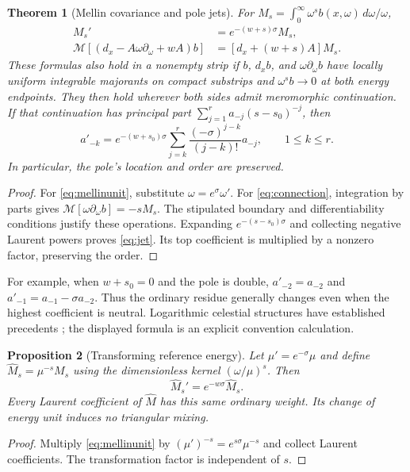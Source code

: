 \documentclass[11pt]{article}
\newtheorem{theorem}{Theorem}
\newtheorem{proposition}[theorem]{Proposition}
\theoremstyle{remark}\newtheorem{remark}[theorem]{Remark}
\newcommand{\Mell}{\mathcal M}
\begin{document}
\begin{theorem}[Mellin covariance and pole jets]\label{thm:units}
For $M_s=\int_0^\infty\omega^sb(x,\omega)\,d\omega/\omega$,
\begin{align}
 M_s'&=e^{-(w+s)\sigma}M_s,\label{eq:mellinunit}\\
 \Mell[(d_x-A\omega\partial_\omega+wA)b]
 &=[d_x+(w+s)A]M_s.\label{eq:connection}
\end{align}
These formulas also hold in a nonempty strip if $b$, $d_xb$, and $\omega\partial_\omega b$ have locally uniform integrable majorants on compact substrips and $\omega^sb\to0$ at both energy endpoints. They then hold wherever both sides admit meromorphic continuation. If that continuation has principal part $\sum_{j=1}^r a_{-j}(s-s_0)^{-j}$, then
\begin{equation}\label{eq:jet}
 a'_{-k}=e^{-(w+s_0)\sigma}
 \sum_{j=k}^r\frac{(-\sigma)^{j-k}}{(j-k)!}a_{-j},\qquad 1\le k\le r.
\end{equation}
In particular, the pole's location and order are preserved.
\end{theorem}
\begin{proof}
For \eqref{eq:mellinunit}, substitute $\omega=e^\sigma\omega'$. For \eqref{eq:connection}, integration by parts gives $\Mell[\omega\partial_\omega b]=-sM_s$. The stipulated boundary and differentiability conditions justify these operations. Expanding $e^{-(s-s_0)\sigma}$ and collecting negative Laurent powers proves \eqref{eq:jet}. Its top coefficient is multiplied by a nonzero factor, preserving the order.
\end{proof}

For example, when $w+s_0=0$ and the pole is double, $a'_{-2}=a_{-2}$ and $a'_{-1}=a_{-1}-\sigma a_{-2}$. Thus the ordinary residue generally changes even when the highest coefficient is neutral. Logarithmic celestial structures have established precedents \cite{bissi}; the displayed formula is an explicit convention calculation.

\begin{proposition}[Transforming reference energy]\label{prop:compensator}
Let $\mu'=e^{-\sigma}\mu$ and define $\widehat M_s=\mu^{-s}M_s$ using the dimensionless kernel $(\omega/\mu)^s$. Then
\begin{equation}
 \widehat M_s'=e^{-w\sigma}\widehat M_s.
\end{equation}
Every Laurent coefficient of $\widehat M$ has this same ordinary weight. Its change of energy unit induces no triangular mixing.
\end{proposition}
\begin{proof}
Multiply \eqref{eq:mellinunit} by $(\mu')^{-s}=e^{s\sigma}\mu^{-s}$ and collect Laurent coefficients. The transformation factor is independent of $s$.
\end{proof}
\end{document}
